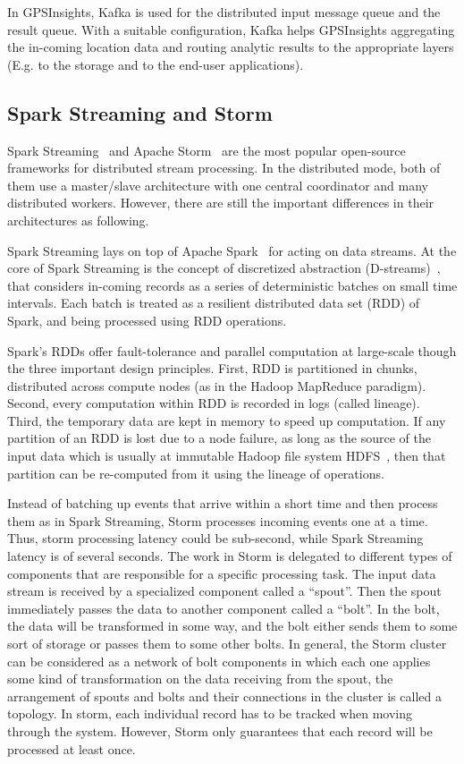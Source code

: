 \documentclass{sig-alternate-05-2015}
\begin{document}
In GPSInsights, Kafka is used for the distributed input message queue and the result queue. With a suitable configuration, Kafka helps GPSInsights aggregating the in-coming location data and routing analytic results to the appropriate layers (E.g. to the storage and to the end-user applications).

\subsection{Spark Streaming and Storm}

Spark Streaming~\cite{learningsparkbook,sparkstreamingweb} and Apache Storm~\cite{stormappliedbook,apachestormweb} are the most popular open-source frameworks for distributed stream processing. In the distributed mode, both of them use a master/slave architecture with one central coordinator and many distributed workers. However, there are still the important differences in their architectures as following.

Spark Streaming lays on top of Apache Spark~\cite{Zaharia:2010:Spark} for acting on data streams.
 At the core of Spark Streaming is the concept of discretized abstraction (D-streams)~\cite{Zaharia:2013:Discretized,Zaharia:2012:Discretized}, that considers in-coming records as a series of deterministic batches on small time intervals. Each batch is treated as a resilient distributed data set (RDD) of Spark, and being processed using RDD operations. 

Spark's RDDs offer fault-tolerance and parallel computation at large-scale though the three important design principles. First, RDD is partitioned in chunks, distributed across compute nodes (as in the Hadoop MapReduce paradigm). Second, every computation within RDD is recorded in logs (called lineage). Third, the temporary data are kept in memory to speed up computation. If any partition of an RDD is lost due to a node failure, as long as the source of the input data which is usually at immutable Hadoop file system HDFS~\cite{shvachko2010hadoop}, then that partition can be re-computed from it using the lineage of operations.

Instead of batching up events that arrive within a short time and then process them as in Spark Streaming, Storm processes incoming events one at a time. Thus, storm processing latency could be sub-second, while Spark Streaming latency is of several seconds. The work in Storm is delegated to different types of components that are responsible for a specific processing task. The input data stream is received by a specialized component called a ``spout''. Then the spout immediately passes the data to another component called a ``bolt''. In the bolt, the data will be transformed in some way, and the bolt either sends them to some sort of storage or passes them to some other bolts. In general, the Storm cluster can be considered as a network of bolt components in which each one applies some kind of transformation on the data receiving from the spout, the arrangement of spouts and bolts and their connections in the cluster is called a topology. In storm, each individual record has to be tracked when moving through the system. However, Storm only guarantees that each record will be processed at least once.
\end{document}
